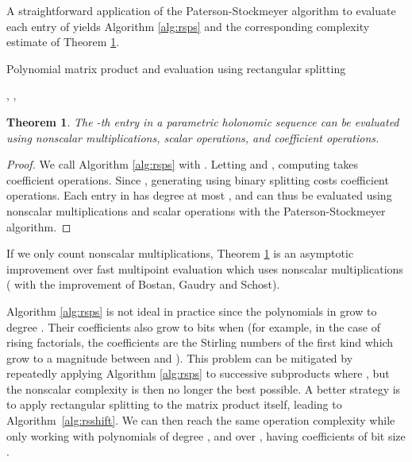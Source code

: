 \documentclass{sig-alternate}
\newtheorem{theorem}{Theorem}
\begin{document}
A straightforward application of the Paterson-Stockmeyer
algorithm to evaluate each entry of 
yields Algorithm \ref{alg:rsps}
and the corresponding complexity estimate of Theorem \ref{propsqrt}.

\begin{algorithm}
  \caption{Polynomial matrix product and evaluation using rectangular splitting}
  \label{alg:rsps}
  \begin{algorithmic}[1]
    \Require , , 
    \Ensure 
    \State 
    \Statex {}
    \State  {}
    \State 
    \Statex {}
    \State \Return{}
  \end{algorithmic}
\end{algorithm}

\begin{theorem}
The -th entry in a parametric holonomic sequence can be evaluated
using  nonscalar multiplications,  scalar
operations, and  coefficient operations.
\label{propsqrt}
\end{theorem}

\begin{proof}
We call Algorithm \ref{alg:rsps} with .
Letting  and ,
computing 
takes  coefficient operations.
Since , generating 
using binary splitting costs
 coefficient operations.
Each entry in  has degree at most ,
and can thus be evaluated using 
nonscalar multiplications and  scalar operations
with the Paterson-Stockmeyer algorithm.
\end{proof}

If we only count nonscalar multiplications, Theorem \ref{propsqrt}
is an asymptotic improvement over fast multipoint evaluation which
uses  nonscalar multiplications
( with the improvement of
Bostan, Gaudry and Schost).

Algorithm \ref{alg:rsps} is not ideal in practice
since the polynomials in  grow to degree .
Their coefficients also grow
to  bits when  (for example,
in the case of rising factorials,
the coefficients are the Stirling numbers of the first
kind  which grow to a magnitude between  and ).
This problem can be mitigated by repeatedly applying Algorithm \ref{alg:rsps}
to successive subproducts  where ,
but the nonscalar complexity is then no longer the best possible.
A better strategy is to apply
rectangular splitting to the matrix product itself, leading to
Algorithm~\ref{alg:rsshift}.
We can then reach the same operation complexity
while only working with polynomials of degree ,
and over , having coefficients of bit size .
\end{document}
